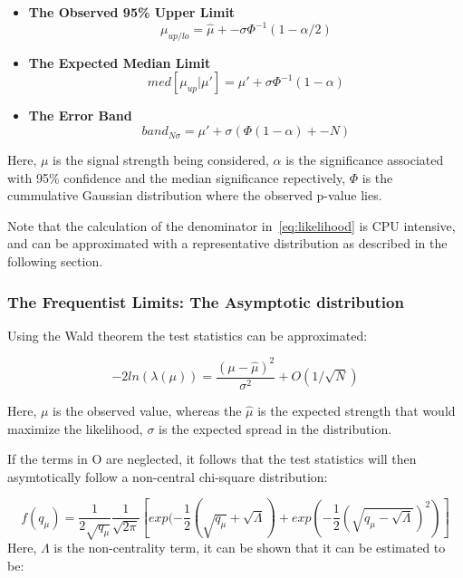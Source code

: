 \begin{itemize}


\item \textbf{The Observed 95\% Upper Limit}
\begin{equation}
\mu_{up/lo} = \hat{\mu} +- \sigma\Phi^{-1}(1-\alpha/2)
\end{equation}

\item \textbf{The Expected Median Limit}
\begin{equation}
    med[\mu_{up}|\mu'] = \mu' + \sigma\Phi^{-1}(1-\alpha) 
\end{equation}

\item \textbf{The Error Band}
\begin{equation}
    band_{N\sigma} = \mu' + \sigma(\Phi(1-\alpha)+-N)
\end{equation}

\end{itemize}


Here, $\mu$ is the signal strength being considered, $\alpha$ is the significance associated with 95$\%$ confidence and the median significance repectively, $\Phi$ is the cummulative Gaussian distribution where the observed p-value lies.

Note that the calculation of the denominator in~\ref{eq:likelihood} is CPU intensive, and can be approximated with a representative distribution as described in the following section.


\subsubsection{The Frequentist Limits: The Asymptotic distribution}
\label{sec:asymp}


Using the Wald theorem the test statistics can be approximated: 

\begin{equation}
-2ln(\lambda(\mu))= \frac{(\mu- \hat{\mu})^{2}}{\sigma^{2}} +O(1/\sqrt{N})
\label{eq:wald}
\end{equation}

Here, $\mu$ is the observed value, whereas the $\hat{\mu}$ is the expected strength that would maximize the likelihood, $\sigma$ is the expected spread in the distribution. 

If the terms in O are neglected, it follows that the test statistics will then asymtotically follow a non-central chi-square distribution: 

\begin{equation}
    f(q_{\mu}) = \frac{1}{2\sqrt{q_{\mu}}} \frac{1}{\sqrt{2\pi}} [exp(-\frac{1}{2}(\sqrt{q_{\mu}}+ \sqrt{\Lambda})+ exp(-\frac{1}{2}(\sqrt{q_{\mu}-\sqrt{\Lambda}})^{2})]
\end{equation}
Here, $\Lambda$ is the non-centrality term, it can be shown that it can be estimated to be:

